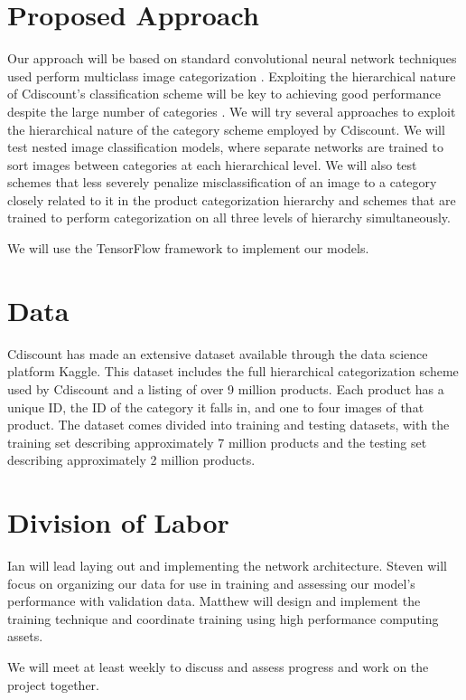 \documentclass[10pt,twocolumn,letterpaper]{article}
\begin{document}
\section{Proposed Approach}

Our approach will be based on standard convolutional neural network techniques used perform multiclass image categorization \cite{Krizhevsky2012}.
Exploiting the hierarchical nature of Cdiscount's classification scheme will be key to achieving good performance despite the large number of categories \cite{deng2010does}.
We will try several approaches to exploit the hierarchical nature of the category scheme employed by Cdiscount.
We will test nested image classification models, where separate networks are trained to sort images between categories at each hierarchical level.
We will also test schemes that less severely penalize misclassification of an image to a category closely related to it in the product categorization hierarchy and schemes that are trained to perform categorization on all three levels of hierarchy simultaneously.

We will use the TensorFlow framework to implement our models.

\section{Data}

Cdiscount has made an extensive dataset available through the data science platform Kaggle.
This dataset includes the full hierarchical categorization scheme used by Cdiscount and a listing of over 9 million products.
Each product has a unique ID, the ID of the category it falls in, and one to four images of that product.
The dataset comes divided into training and testing datasets, with the training set describing approximately 7 million products and the testing set describing approximately 2 million products.

\section{Division of Labor}

Ian will lead laying out and implementing the network architecture.
Steven will focus on organizing our data for use in training and assessing our model's performance with validation data.
Matthew will design and implement the training technique and coordinate training using high performance computing assets.

We will meet at least weekly to discuss and assess progress and work on the project together.
\end{document}
